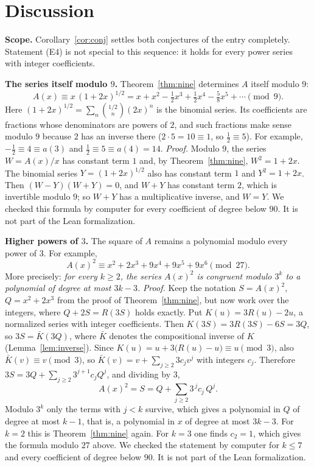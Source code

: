 \documentclass[11pt,a4paper]{article}
\theoremstyle{definition}
\theoremstyle{remark}
\newcommand{\para}[1]{\par\medskip\noindent\textbf{#1}\enspace}
\begin{document}
\section{Discussion}\label{sec:discussion}

\para{Scope.} Corollary~\ref{cor:conj} settles both conjectures of the entry completely. Statement (E4) is not special to
this sequence: it holds for every power series with integer coefficients.

\para{The series itself modulo $9$.} Theorem~\ref{thm:nine} determines $A$ itself modulo $9$:
\[
A(x)\equiv x\,(1+2x)^{1/2}=x+x^2-\tfrac12x^3+\tfrac12x^4-\tfrac58x^5+\cdots\pmod 9 .
\]
Here $(1+2x)^{1/2}=\sum_n\binom{1/2}{n}(2x)^n$ is the binomial series. Its coefficients are fractions whose
denominators are powers of $2$, and such fractions make sense modulo $9$ because $2$ has an inverse there
($2\cdot5=10\equiv1$, so $\frac12\equiv5$). For example, $-\frac12\equiv4\equiv a(3)$ and $\frac12\equiv5\equiv a(4)=14$.
\emph{Proof.} Modulo $9$, the series $W=A(x)/x$ has constant term $1$ and, by Theorem~\ref{thm:nine}, $W^2=1+2x$. The
binomial series $Y=(1+2x)^{1/2}$ also has constant term $1$ and $Y^2=1+2x$. Then $(W-Y)(W+Y)=0$, and $W+Y$ has
constant term $2$, which is invertible modulo $9$; so $W+Y$ has a multiplicative inverse, and $W=Y$. We checked this
formula by computer for every coefficient of degree below $90$. It is not part of the Lean formalization.

\para{Higher powers of $3$.} The square of $A$ remains a polynomial modulo every power of $3$. For example,
\[
A(x)^2\equiv x^2+2x^3+9x^4+9x^5+9x^6\pmod{27}.
\]
More precisely: \emph{for every $k\ge2$, the series $A(x)^2$ is congruent modulo $3^k$ to a polynomial of degree at most
$3k-3$.} \emph{Proof.} Keep the notation $S=A(x)^2$, $Q=x^2+2x^3$ from the proof of Theorem~\ref{thm:nine}, but now
work over the integers, where $Q+2S=R(3S)$ holds exactly. Put $K(u)=3R(u)-2u$, a normalized series with integer
coefficients. Then $K(3S)=3R(3S)-6S=3Q$, so $3S=\bar K(3Q)$, where $\bar K$ denotes the compositional inverse of $K$
(Lemma~\ref{lem:inverse}). Since $K(u)=u+3\bigl(R(u)-u\bigr)\equiv u\pmod 3$, also $\bar K(v)\equiv v\pmod3$, so
$\bar K(v)=v+\sum_{j\ge2}3c_jv^j$ with integers $c_j$. Therefore
$3S=3Q+\sum_{j\ge2}3^{j+1}c_jQ^j$, and dividing by $3$,
\[
A(x)^2=S=Q+\sum_{j\ge2}3^{\,j}c_j\,Q^j .
\]
Modulo $3^k$ only the terms with $j<k$ survive, which gives a polynomial in $Q$ of degree at most $k-1$, that is, a
polynomial in $x$ of degree at most $3k-3$. For $k=2$ this is Theorem~\ref{thm:nine} again. For $k=3$ one finds
$c_2=1$, which gives the formula modulo $27$ above. We checked the statement by computer for $k\le7$ and every coefficient
of degree below $90$. It is not part of the Lean formalization.
\end{document}
